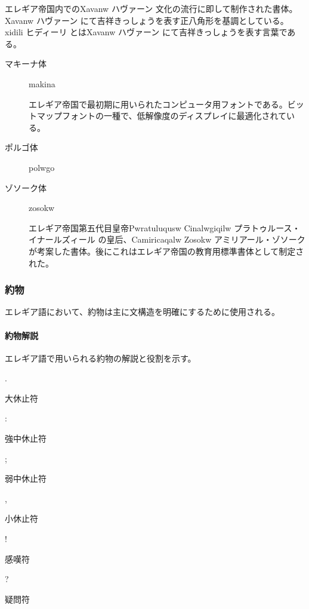 \documentclass[
  japanese,
]{article}
\begin{document}
\begin{description}
\begin{description}
エレギア帝国内での{Xavanw} ハヴァーン
文化の流行に即して制作された書体。{Xavanw} ハヴァーン
にて吉祥きっしょうを表す正八角形を基調としている。{xidili} ヒディーリ
とは{Xavanw} ハヴァーン にて吉祥きっしょうを表す言葉である。
\end{description}
\item[近世書体]
\begin{description}
\item[マキーナ体]
{makina}

エレギア帝国で最初期に用いられたコンピュータ用フォントである。ビットマップフォントの一種で、低解像度のディスプレイに最適化されている。
\item[ポルゴ体]
{polwgo}
\item[ゾソーク体]
{zosokw}

エレギア帝国第五代目皇帝{Pwratuluqusw Cinalwgiqilw}
プラトゥルース・イナールズィール の皇后、{Camiricaqalw Zosokw}
アミリアール・ゾソーク
が考案した書体。後にこれはエレギア帝国の教育用標準書体として制定された。
\end{description}
\end{description}

\subsubsection{約物}\label{section3.3}

エレギア語において、約物は主に文構造を明確にするために使用される。

\paragraph{約物解説}\label{subsection3.3.1}

エレギア語で用いられる約物の解説と役割を示す。

{.}

大休止符

{:}

強中休止符

{;}

弱中休止符

{,}

小休止符

{!}

感嘆符

{?}

疑問符

\begin{figure}
\centering
\caption{}\label{ltr-figure}
\end{figure}
\end{document}
